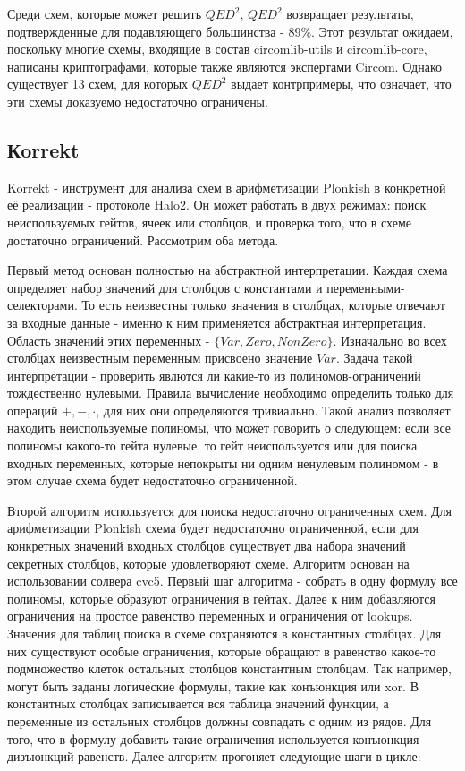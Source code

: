 \documentclass[a4paper]{article}
\begin{document}
Среди схем, которые может решить $QED^2$, $QED^2$ возвращает результаты, подтвержденные для подавляющего большинства - $89\%$.
Этот результат ожидаем, поскольку многие схемы, входящие в состав circomlib-utils и circomlib-core, написаны криптографами, которые также являются экспертами Circom. Однако существует 13 схем, для
которых $QED^2$ выдает контрпримеры, что означает, что эти схемы доказуемо недостаточно ограничены.

\subsection{Кorrekt}

Korrekt - инструмент для анализа схем в арифметизации Plonkish в конкретной её реализации - протоколе Halo2. Он может работать в двух режимах: поиск неиспользуемых гейтов, ячеек или столбцов, и проверка того, что в схеме достаточно ограничений. Рассмотрим оба метода.

Первый метод основан полностью на абстрактной интерпретации. Каждая схема определяет набор значений для столбцов с константами и переменными-селекторами. То есть неизвестны только значения в столбцах, которые отвечают за входные данные - именно к ним применяется абстрактная интерпретация. Область значений этих переменных - $\{Var, Zero, NonZero\}$. Изначально во всех столбцах неизвестным переменным присвоено значение $Var$. Задача такой интерпретации - проверить явлются ли какие-то из полиномов-ограничений тождественно нулевыми. Правила вычисление необходимо определить только для операций $+, -, \cdot$, для них они определяются тривиально. Такой анализ позволяет находить неиспользуемые полиномы, что может говорить о следующем: если все полиномы какого-то гейта нулевые, то гейт неиспользуется или для поиска входных переменных, которые непокрыты ни одним ненулевым полиномом - в этом случае схема будет недостаточно ограниченной.

Второй алгоритм используется для поиска недостаточно ограниченных схем. Для арифметизации Plonkish схема будет недостаточно ограниченной, если для конкретных значений входных столбцов существует два набора значений секретных столбцов, которые удовлетворяют схеме. Алгоритм основан на использовании солвера cvc5. Первый шаг алгоритма - собрать в одну формулу все полиномы, которые образуют ограничения в гейтах. Далее к ним добавляются ограничения на простое равенство переменных и ограничения от lookups. Значения для таблиц поиска в схеме сохраняются в константных столбцах. Для них существуют особые ограничения, которые обращают в равенство какое-то подмножество клеток остальных столбцов константным столбцам. Так например, могут быть заданы логические формулы, такие как конъюнкция или xor. В константных столбцах записывается вся таблица значений функции, а переменные из остальных столбцов должны совпадать с одним из рядов. Для того, что в формулу добавить такие ограничения используется конъюнкция дизъюнкций равенств. Далее алгоритм прогоняет следующие шаги в цикле:
\end{document}

